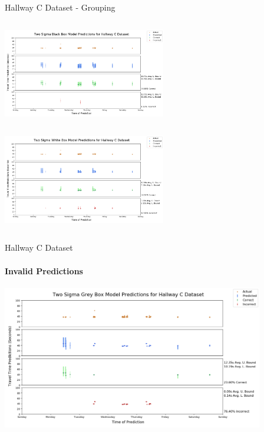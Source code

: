 \documentclass{beamer}
\begin{document}
\begin{frame}[t]{Hallway C Dataset - Grouping}

  \vspace*{-0.9cm}
  \begin{columns}[t]
    {\includegraphics[width = 2.8in]{images/hallway/two_sigma_black_box_model_predictions_for_hallway_c_dataset.png}}

    \begin{overlayarea}{0.5\textwidth}{0.5\textheight}


    \end{overlayarea}
  \end{columns}
  \vspace*{-0.3cm}

  \begin{columns}[t]
    {\includegraphics[width = 2.8in]{images/hallway/two_sigma_white_box_model_predictions_for_hallway_c_dataset.png}}
  \end{columns}

\end{frame}



\begin{frame}[t]{Hallway C Dataset}
  \framesubtitle{Invalid Predictions}

  {\includegraphics[width = 4.5in]{images/hallway/two_sigma_grey_box_model_predictions_for_hallway_c_dataset.png}}

\end{frame}
\end{document}

